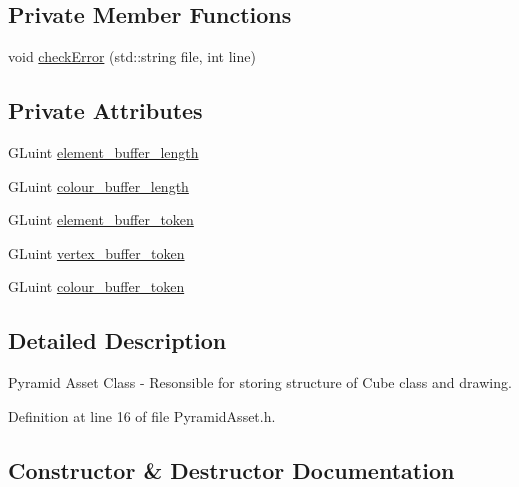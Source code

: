 \subsection*{Private Member Functions}
\begin{DoxyCompactItemize}
\item 
void \hyperlink{class_pyramid_asset_a34350044042e0098446dc9e0a260cb70}{check\+Error} (std\+::string file, int line)
\end{DoxyCompactItemize}
\subsection*{Private Attributes}
\begin{DoxyCompactItemize}
\item 
G\+Luint \hyperlink{class_pyramid_asset_a5566105859271b493eab3b5f9c02f866}{element\+\_\+buffer\+\_\+length}
\item 
G\+Luint \hyperlink{class_pyramid_asset_addd87a747d7bd186bd1b3e3070185c69}{colour\+\_\+buffer\+\_\+length}
\item 
G\+Luint \hyperlink{class_pyramid_asset_a6f7e2f50904d2941e33df8eb7f5f9c2d}{element\+\_\+buffer\+\_\+token}
\item 
G\+Luint \hyperlink{class_pyramid_asset_a54d9cec42bc77d07a66e6c1cd55049b0}{vertex\+\_\+buffer\+\_\+token}
\item 
G\+Luint \hyperlink{class_pyramid_asset_a1c82b429f52d92feefacb5755017aec0}{colour\+\_\+buffer\+\_\+token}
\end{DoxyCompactItemize}


\subsection{Detailed Description}
Pyramid Asset Class -\/ Resonsible for storing structure of Cube class and drawing. 

Definition at line 16 of file Pyramid\+Asset.\+h.



\subsection{Constructor \& Destructor Documentation}
\hypertarget{class_pyramid_asset_a7ee5d5547c6b6b3595af4ee512b75ba0}{}
